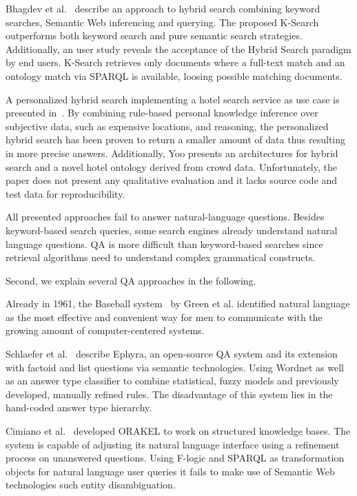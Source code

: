 Bhagdev et al.~\cite{Bhagdev:2008:HSE} describe an approach to hybrid search combining keyword searches, Semantic Web inferencing and querying. 
The proposed K-Search outperforms both keyword search and pure semantic search strategies.
Additionally, an user study reveals the acceptance of the Hybrid Search paradigm by end users.
K-Search retrieves only documents where a full-text match and an ontology match via SPARQL is available, loosing possible matching documents.

A personalized hybrid search implementing a  hotel search service as use case is presented in~\cite{DBLP:journals/kbs/Yoo12}. 
By combining rule-based personal knowledge inference over subjective data, such as expensive locations, and reasoning, the personalized hybrid search has been proven to return a smaller amount of data thus resulting in more precise answers. 
Additionally, Yoo presents an architectures for hybrid search and a novel hotel ontology derived from crowd data. 
Unfortunately, the paper does not present any qualitative evaluation and it lacks source code and test data for reproducibility. 

All presented approaches fail to answer natural-language questions.
Besides keyword-based search queries, some search engines already understand natural language questions. \ac{QA} is more difficult than keyword-based searches since retrieval algorithms need to understand complex grammatical constructs.


Second, we explain several QA approaches in the following.

Already in 1961, the Baseball system~\cite{green1961baseball} by Green et al. identified natural language as the most effective and convenient way for men to communicate with the growing amount of computer-centered systems. 

{Schlaefer et al.~\cite{ephyra2007}} describe {Ephyra}, an open-source \ac{QA} system and its extension with factoid and list questions via semantic technologies.
Using Wordnet as well as an answer type classifier to combine statistical, fuzzy models and previously developed, manually refined rules. The disadvantage of this system lies in the hand-coded answer type hierarchy. %

Cimiano et al.~\cite{orakel} developed {ORAKEL} to work on structured knowledge bases.
The system is capable of adjusting its natural language interface using a refinement process on unanswered questions. 
Using F-logic and SPARQL as transformation objects for natural language user queries it fails to make use of Semantic Web technologies such entity disambiguation.

